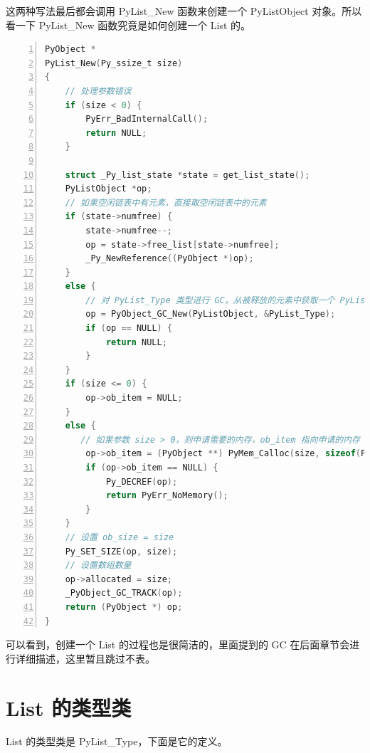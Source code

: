 这两种写法最后都会调用 PyList\_New 函数来创建一个  PyListObject 对象。所以看一下 PyList\_New 函数究竟是如何创建一个 List 的。

\begin{lstlisting}[language=C, numbers=left, numbersep=1em, numberstyle=\footnotesize , breaklines=true]
PyObject *
PyList_New(Py_ssize_t size)
{
    // 处理参数错误
    if (size < 0) {
        PyErr_BadInternalCall();
        return NULL;
    }

    struct _Py_list_state *state = get_list_state();
    PyListObject *op;
    // 如果空闲链表中有元素，直接取空闲链表中的元素
    if (state->numfree) {
        state->numfree--;
        op = state->free_list[state->numfree];
        _Py_NewReference((PyObject *)op);
    }
    else {
        // 对 PyList_Type 类型进行 GC，从被释放的元素中获取一个 PyListObject
        op = PyObject_GC_New(PyListObject, &PyList_Type);
        if (op == NULL) {
            return NULL;
        }
    }
    if (size <= 0) {
        op->ob_item = NULL;
    }
    else {
       // 如果参数 size > 0，则申请需要的内存，ob_item 指向申请的内存
        op->ob_item = (PyObject **) PyMem_Calloc(size, sizeof(PyObject *));
        if (op->ob_item == NULL) {
            Py_DECREF(op);
            return PyErr_NoMemory();
        }
    }
    // 设置 ob_size = size
    Py_SET_SIZE(op, size);
    // 设置数组数量
    op->allocated = size;
    _PyObject_GC_TRACK(op);
    return (PyObject *) op;
}
\end{lstlisting}

可以看到，创建一个 List 的过程也是很简洁的，里面提到的 GC 在后面章节会进行详细描述，这里暂且跳过不表。

\section{List 的类型类}

List 的类型类是 PyList\_Type，下面是它的定义。

